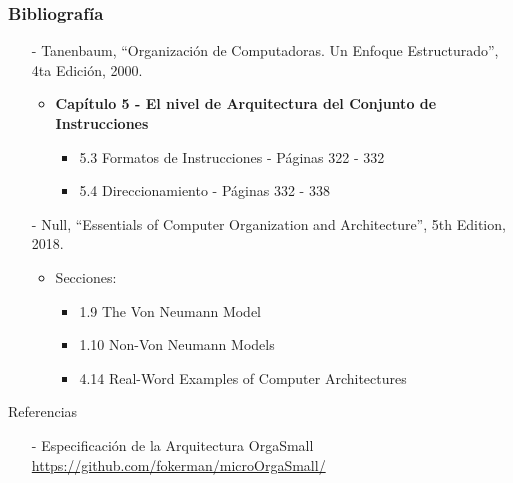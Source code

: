 \documentclass[aspectratio=169]{beamer}
\begin{document}
\begin{frame}[fragile]
    \frametitle{Bibliografía}
    \begin{itemize}
     \setlength\itemsep{0.5cm}
    \item[-] \small Tanenbaum, “Organización de Computadoras. Un Enfoque Estructurado”, 4ta Edición, 2000.\\
    \begin{itemize}
     \item \textbf{Capítulo 5 - El nivel de Arquitectura del Conjunto de Instrucciones}\\
     \begin{itemize}
     \item 5.3 Formatos de Instrucciones - Páginas 322 - 332
     \item 5.4 Direccionamiento - Páginas 332 - 338
     \end{itemize}
    \end{itemize}
    \item[-] \small Null, “Essentials of Computer Organization and Architecture”, 5th Edition, 2018.\\
    \begin{itemize}
     \item Secciones:
     \begin{itemize}
    \item 1.9 The Von Neumann Model
    \item 1.10 Non-Von Neumann Models
     \item 4.14 Real-Word Examples of Computer Architectures
     \end{itemize}
    \end{itemize}
    \end{itemize}
     \textcolor{naranjauca}{Referencias}
     \begin{itemize}
    \item[-] Especificación de la Arquitectura OrgaSmall\\ \small \url{https://github.com/fokerman/microOrgaSmall/}
    \end{itemize}
\end{frame}
\end{document}
